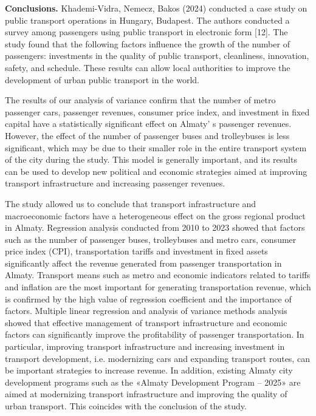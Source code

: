 {\bfseries Conclusions.} Khademi-Vidra, Nemecz, Bakos (2024) conducted a
case study on public transport operations in Hungary, Budapest. The
authors conducted a survey among passengers using public transport in
electronic form {[}12{]}. The study found that the following factors
influence the growth of the number of passengers: investments in the
quality of public transport, cleanliness, innovation, safety, and
schedule. These results can allow local authorities to improve the
development of urban public transport in the world.

The results of our analysis of variance confirm that the number of metro
passenger cars, passenger revenues, consumer price index, and investment
in fixed capital have a statistically significant effect on
Almaty' s passenger revenues. However, the effect of the
number of passenger buses and trolleybuses is less significant, which
may be due to their smaller role in the entire transport system of the
city during the study. This model is generally important, and its
results can be used to develop new political and economic strategies
aimed at improving transport infrastructure and increasing passenger
revenues.

The study allowed us to conclude that transport infrastructure and
macroeconomic factors have a heterogeneous effect on the gross regional
product in Almaty. Regression analysis conducted from 2010 to 2023
showed that factors such as the number of passenger buses, trolleybuses
and metro cars, consumer price index (CPI), transportation tariffs and
investment in fixed assets significantly affect the revenue generated
from passenger transportation in Almaty. Transport means such as metro
and economic indicators related to tariffs and inflation are the most
important for generating transportation revenue, which is confirmed by
the high value of regression coefficient and the importance of factors.
Multiple linear regression and analysis of variance methods analysis
showed that effective management of transport infrastructure and
economic factors can significantly improve the profitability of
passenger transportation. In particular, improving transport
infrastructure and increasing investment in transport development, i.e.
modernizing cars and expanding transport routes, can be important
strategies to increase revenue. In addition, existing Almaty city
development programs such as the «Almaty Development Program -- 2025»
are aimed at modernizing transport infrastructure and improving the
quality of urban transport. This coincides with the conclusion of the
study.


